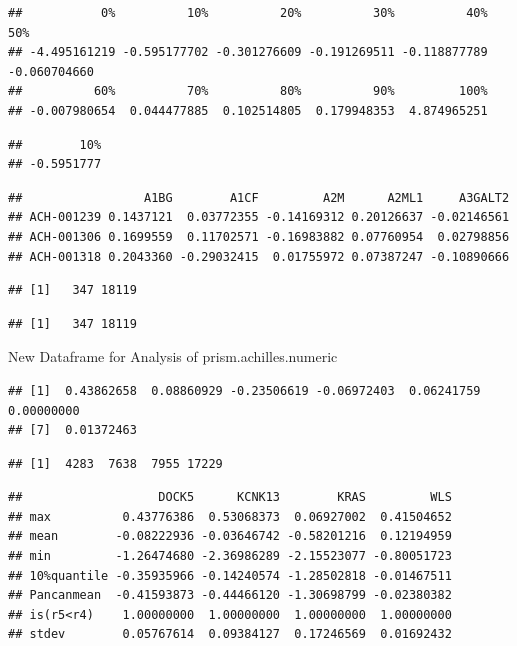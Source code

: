 \documentclass[
]{article}
\begin{document}
\begin{verbatim}
##           0%          10%          20%          30%          40%          50% 
## -4.495161219 -0.595177702 -0.301276609 -0.191269511 -0.118877789 -0.060704660 
##          60%          70%          80%          90%         100% 
## -0.007980654  0.044477885  0.102514805  0.179948353  4.874965251
\end{verbatim}

\begin{verbatim}
##        10% 
## -0.5951777
\end{verbatim}

\begin{verbatim}
##                 A1BG        A1CF         A2M      A2ML1     A3GALT2
## ACH-001239 0.1437121  0.03772355 -0.14169312 0.20126637 -0.02146561
## ACH-001306 0.1699559  0.11702571 -0.16983882 0.07760954  0.02798856
## ACH-001318 0.2043360 -0.29032415  0.01755972 0.07387247 -0.10890666
\end{verbatim}

\begin{verbatim}
## [1]   347 18119
\end{verbatim}

\begin{verbatim}
## [1]   347 18119
\end{verbatim}

New Dataframe for Analysis of prism.achilles.numeric

\begin{verbatim}
## [1]  0.43862658  0.08860929 -0.23506619 -0.06972403  0.06241759  0.00000000
## [7]  0.01372463
\end{verbatim}

\begin{verbatim}
## [1]  4283  7638  7955 17229
\end{verbatim}

\begin{verbatim}
##                   DOCK5      KCNK13        KRAS         WLS
## max          0.43776386  0.53068373  0.06927002  0.41504652
## mean        -0.08222936 -0.03646742 -0.58201216  0.12194959
## min         -1.26474680 -2.36986289 -2.15523077 -0.80051723
## 10%quantile -0.35935966 -0.14240574 -1.28502818 -0.01467511
## Pancanmean  -0.41593873 -0.44466120 -1.30698799 -0.02380382
## is(r5<r4)    1.00000000  1.00000000  1.00000000  1.00000000
## stdev        0.05767614  0.09384127  0.17246569  0.01692432
\end{verbatim}
\end{document}
